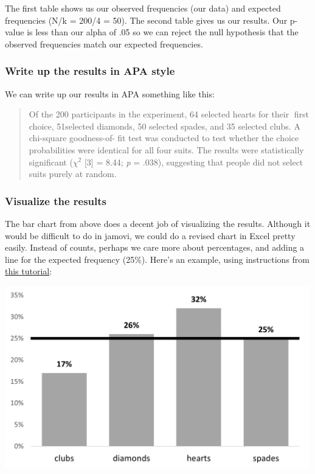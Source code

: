 \documentclass[
]{book}
\begin{document}
The first table shows us our observed frequencies (our data) and expected frequencies (N/k = 200/4 = 50). The second table gives us our results. Our p-value is less than our alpha of .05 so we can reject the null hypothesis that the observed frequencies match our expected frequencies.

\hypertarget{write-up-the-results-in-apa-style-3}{%
\subsubsection{Write up the results in APA style}\label{write-up-the-results-in-apa-style-3}}

We can write up our results in APA something like this:

\begin{quote}
Of the 200 participants in the experiment, 64 selected hearts for their first choice, 51selected diamonds, 50 selected spades, and 35 selected clubs. A chi-square goodness-of-fit test was conducted to test whether the choice probabilities were identical for all four suits. The results were statistically significant (\(\chi^2\) {[}3{]} = 8.44; \emph{p} = .038), suggesting that people did not select suits purely at random.
\end{quote}

\hypertarget{visualize-the-results-3}{%
\subsubsection{Visualize the results}\label{visualize-the-results-3}}

The bar chart from above does a decent job of visualizing the results. Although it would be difficult to do in jamovi, we could do a revised chart in Excel pretty easily. Instead of counts, perhaps we care more about percentages, and adding a line for the expected frequency (25\%). Here's an example, using instructions from \href{https://exceljet.net/chart/column-chart-with-target-line}{this tutorial}:

\includegraphics[width=5.20833in,height=\textheight]{images/09-chi-square/chi-square_excel.png}
\end{document}
